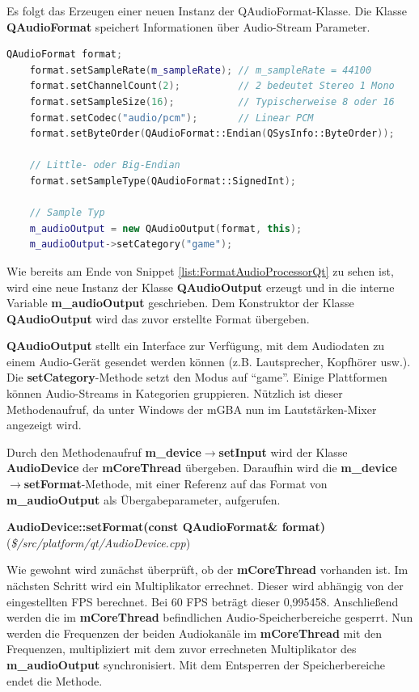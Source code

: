 \documentclass[11pt,a4paper]{scrartcl}
\newcommand{\paratitlecode}[2] {
    \vspace{5mm}
    \large \textbf{#1} \normalsize(\textit{\${#2}})
    \vspace{2mm}\newline
}
\begin{document}
Es folgt das Erzeugen einer neuen Instanz der QAudioFormat-Klasse. Die Klasse \textbf{QAudioFormat} speichert Informationen \"uber Audio-Stream Parameter.

\vspace{5mm}
\begin{lstlisting}[language=C++, caption={Ausschnitt aus AudioProcessorQt::start()}, label={list:FormatAudioProcessorQt}]
    QAudioFormat format;
    format.setSampleRate(m_sampleRate); // m_sampleRate = 44100
    format.setChannelCount(2);			// 2 bedeutet Stereo 1 Mono
    format.setSampleSize(16);			// Typischerweise 8 oder 16
    format.setCodec("audio/pcm");		// Linear PCM
    format.setByteOrder(QAudioFormat::Endian(QSysInfo::ByteOrder));

    // Little- oder Big-Endian
    format.setSampleType(QAudioFormat::SignedInt);

    // Sample Typ
    m_audioOutput = new QAudioOutput(format, this);
    m_audioOutput->setCategory("game");
\end{lstlisting}
  
Wie bereits am Ende von Snippet \ref{list:FormatAudioProcessorQt} zu sehen ist, wird eine neue Instanz der Klasse \textbf{QAudioOutput} erzeugt und in die interne Variable \textbf{m\_audioOutput} geschrieben. Dem Konstruktor der Klasse \textbf{QAudioOutput} wird das zuvor erstellte Format \"ubergeben.

\textbf{QAudioOutput} stellt ein Interface zur Verf\"ugung, mit dem Audiodaten zu einem Audio-Ger\"at gesendet werden k\"onnen (z.B. Lautsprecher, Kopfh\"orer usw.). Die \textbf{setCategory}-Methode setzt den Modus auf \enquote{game}. Einige Plattformen k\"onnen Audio-Streams in Kategorien gruppieren. N\"utzlich ist dieser Methodenaufruf, da unter Windows der mGBA nun im Lautst\"arken-Mixer angezeigt wird.

Durch den Methodenaufruf \textbf{m\_device$\rightarrow$setInput} wird der Klasse \textbf{AudioDevice} der \textbf{mCoreThread} \"ubergeben. Daraufhin wird die \textbf{m\_device$\rightarrow$setFormat}-Methode, mit einer Referenz auf
das Format von \textbf{m\_audioOutput} als \"Ubergabeparameter, aufgerufen.

\newpage
\paratitlecode{AudioDevice::setFormat(const QAudioFormat\& format)}{/src/platform/qt/AudioDevice.cpp}
Wie gewohnt wird zun\"achst \"uberpr\"uft, ob der \textbf{mCoreThread} vorhanden ist. Im n\"achsten Schritt wird ein Multiplikator errechnet. Dieser wird abh\"angig von der eingestellten FPS berechnet. Bei 60 FPS betr\"agt dieser 0,995458. Anschlie{\ss}end werden die im \textbf{mCoreThread} befindlichen Audio-Speicherbereiche gesperrt. Nun werden die Frequenzen der beiden Audiokan\"ale im \textbf{mCoreThread} mit den Frequenzen, multipliziert mit dem zuvor errechneten Multiplikator des \textbf{m\_audioOutput} synchronisiert. Mit dem Entsperren der Speicherbereiche endet die Methode.
\end{document}
